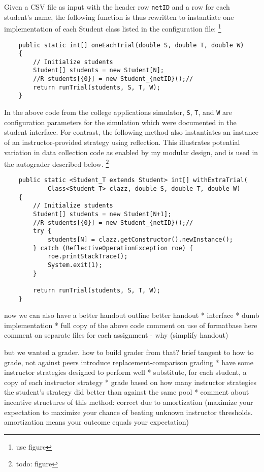 \documentclass[pageno]{jpaper}
\begin{document}
Given a CSV file as input with the header row \texttt{netID} and a row for each student's name, the following function is thus rewritten to instantiate one implementation of each Student class listed in the configuration file:
\footnote{use figure}
\begin{verbatim}
    public static int[] oneEachTrial(double S, double T, double W)
    {
        // Initialize students
        Student[] students = new Student[N];
        //R students[{0}] = new Student_{netID}();//
        return runTrial(students, S, T, W);
    }
\end{verbatim}
In the above code from the college applications simulator, \texttt{S}, \texttt{T}, and \texttt{W} are configuration parameters for the simulation which were documented in the student interface.
For contrast, the following method also instantiates an instance of an instructor-provided strategy using reflection.
This illustrates potential variation in data collection code as enabled by my modular design, and is used in the autograder described below.
\footnote{todo: figure}
\begin{verbatim}
    public static <Student_T extends Student> int[] withExtraTrial(
            Class<Student_T> clazz, double S, double T, double W)
    {
        // Initialize students
        Student[] students = new Student[N+1];
        //R students[{0}] = new Student_{netID}();//
        try {
            students[N] = clazz.getConstructor().newInstance();
        } catch (ReflectiveOperationException roe) {
            roe.printStackTrace();
            System.exit(1);
        }

        return runTrial(students, S, T, W);
    }
\end{verbatim}

now we can also have a better handout
outline better handout
* interface
* dumb implementation
* full copy of the above code
comment on use of formatbase here
comment on separate files for each assignment - why (simplify handout)

but we wanted a grader. how to build grader from that?
brief tangent to how to grade, not against peers
introduce replacement-comparison grading
* have some instructor strategies designed to perform well
* substitute, for each student, a copy of each instructor strategy
* grade based on how many instructor strategies the student's strategy did better than against the same pool
* comment about incentive structures of this method: correct due to amortization (maximize your expectation to maximize your chance of beating unknown instructor thresholds. amortization means your outcome equals your expectation)
\end{document}
